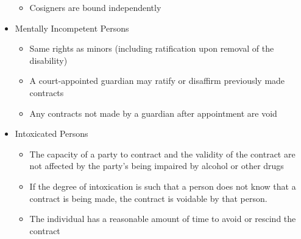 \documentclass{article}
\begin{document}
\begin{itemize}
\begin{itemize}
			\item Cosigners are bound independently
		\end{itemize}
		\item Mentally Incompetent Persons
		\begin{itemize}
			\item Same rights as minors (including ratification upon removal of the disability)
			\item A court-appointed guardian may ratify or disaffirm previously made contracts
			\item Any contracts not made by a guardian after appointment are void
		\end{itemize}
		\item Intoxicated Persons
		\begin{itemize}
			\item The capacity of a party to contract and the validity of the contract are not affected by the party's being impaired by alcohol or other drugs
			\item If the degree of intoxication is such that a person does not know that a contract is being made, the contract is voidable by that person.
			\item The individual has a reasonable amount of time to avoid or rescind the contract
		\end{itemize}
	\end{itemize}
\end{document}
